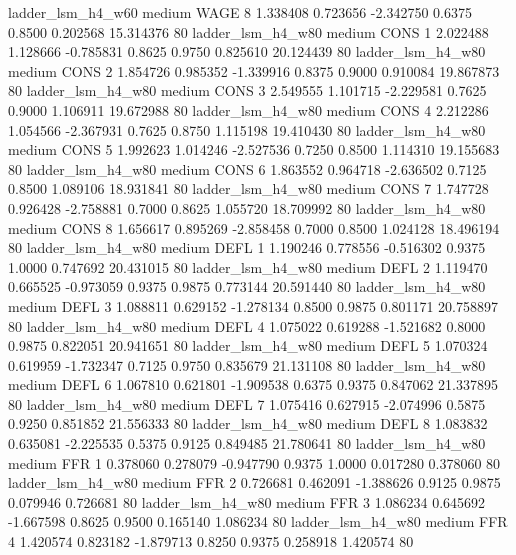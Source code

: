      ladder_lsm_h4_w60     medium     WAGE                 8  1.338408 0.723656 -2.342750 0.6375 0.8500  0.202568   15.314376 80
     ladder_lsm_h4_w80     medium     CONS                 1  2.022488 1.128666 -0.785831 0.8625 0.9750  0.825610   20.124439 80
     ladder_lsm_h4_w80     medium     CONS                 2  1.854726 0.985352 -1.339916 0.8375 0.9000  0.910084   19.867873 80
     ladder_lsm_h4_w80     medium     CONS                 3  2.549555 1.101715 -2.229581 0.7625 0.9000  1.106911   19.672988 80
     ladder_lsm_h4_w80     medium     CONS                 4  2.212286 1.054566 -2.367931 0.7625 0.8750  1.115198   19.410430 80
     ladder_lsm_h4_w80     medium     CONS                 5  1.992623 1.014246 -2.527536 0.7250 0.8500  1.114310   19.155683 80
     ladder_lsm_h4_w80     medium     CONS                 6  1.863552 0.964718 -2.636502 0.7125 0.8500  1.089106   18.931841 80
     ladder_lsm_h4_w80     medium     CONS                 7  1.747728 0.926428 -2.758881 0.7000 0.8625  1.055720   18.709992 80
     ladder_lsm_h4_w80     medium     CONS                 8  1.656617 0.895269 -2.858458 0.7000 0.8500  1.024128   18.496194 80
     ladder_lsm_h4_w80     medium     DEFL                 1  1.190246 0.778556 -0.516302 0.9375 1.0000  0.747692   20.431015 80
     ladder_lsm_h4_w80     medium     DEFL                 2  1.119470 0.665525 -0.973059 0.9375 0.9875  0.773144   20.591440 80
     ladder_lsm_h4_w80     medium     DEFL                 3  1.088811 0.629152 -1.278134 0.8500 0.9875  0.801171   20.758897 80
     ladder_lsm_h4_w80     medium     DEFL                 4  1.075022 0.619288 -1.521682 0.8000 0.9875  0.822051   20.941651 80
     ladder_lsm_h4_w80     medium     DEFL                 5  1.070324 0.619959 -1.732347 0.7125 0.9750  0.835679   21.131108 80
     ladder_lsm_h4_w80     medium     DEFL                 6  1.067810 0.621801 -1.909538 0.6375 0.9375  0.847062   21.337895 80
     ladder_lsm_h4_w80     medium     DEFL                 7  1.075416 0.627915 -2.074996 0.5875 0.9250  0.851852   21.556333 80
     ladder_lsm_h4_w80     medium     DEFL                 8  1.083832 0.635081 -2.225535 0.5375 0.9125  0.849485   21.780641 80
     ladder_lsm_h4_w80     medium      FFR                 1  0.378060 0.278079 -0.947790 0.9375 1.0000  0.017280    0.378060 80
     ladder_lsm_h4_w80     medium      FFR                 2  0.726681 0.462091 -1.388626 0.9125 0.9875  0.079946    0.726681 80
     ladder_lsm_h4_w80     medium      FFR                 3  1.086234 0.645692 -1.667598 0.8625 0.9500  0.165140    1.086234 80
     ladder_lsm_h4_w80     medium      FFR                 4  1.420574 0.823182 -1.879713 0.8250 0.9375  0.258918    1.420574 80
